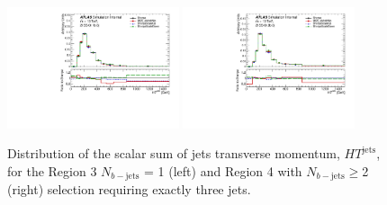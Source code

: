 \begin{figure}[!htb]
\centering
\includegraphics[width=0.45\textwidth]{Plots/ttV/shape/c_Region_2_HT_jets}
\includegraphics[width=0.45\textwidth]{Plots/ttV/shape/c_Region_3_HT_jets}\\
  \caption{Distribution of the scalar sum of jets transverse momentum, $HT^{\text{jets}}$, for the Region 3 $N_{b-\mathrm{jets}}$ = 1 (left) and Region 4 with $N_{b-\mathrm{jets}}\geq$2 (right) selection requiring exactly three jets.  \label{ttV:3j12b}}
\end{figure}


